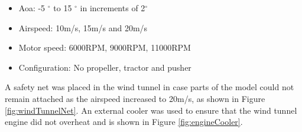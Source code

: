 \begin{itemize}
    \item Aoa: -5 $^{\circ}$ to 15 $^{\circ}$ in increments of 2$^{\circ}$
    \item Airspeed: 10m/s, 15m/s and 20m/s
    \item Motor speed: 6000RPM, 9000RPM, 11000RPM
    \item Configuration: No propeller, tractor and pusher
\end{itemize}


A safety net was placed in the wind tunnel in case parts of the model could not remain attached as the airspeed increased to 20m/s, as shown in Figure \ref{fig:windTunnelNet}. An external cooler was used to ensure that the wind tunnel engine did not overheat and is shown in Figure \ref{fig:engineCooler}.


    


